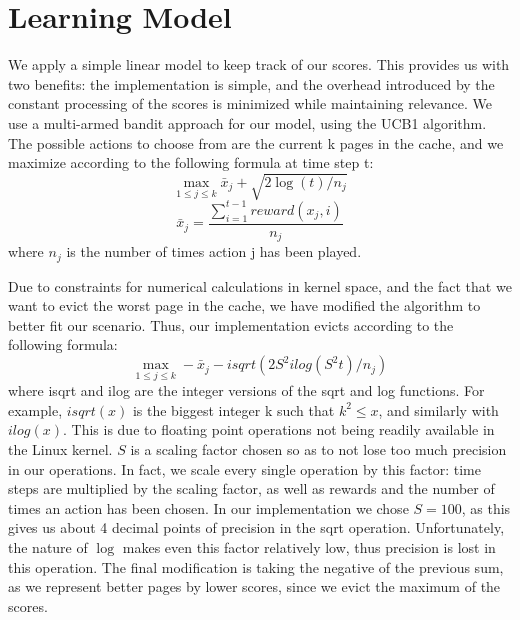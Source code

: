 \section{Learning Model}

We apply a simple linear model to keep track of our scores. This provides us with two benefits: the implementation is simple, and the overhead introduced by the constant processing of the scores is minimized while maintaining relevance. We use a multi-armed bandit approach for our model, using the UCB1 algorithm. The possible actions to choose from are the current k pages in the cache, and we maximize according to the following formula at time step t: $$\max_{1 \leq j \leq k} \bar{x}_{j} + \sqrt{2\log(t)/n_{j}}$$ $$\bar{x}_{j} = \frac{\sum_{i=1}^{t-1} reward(x_{j},i)}{n_{j}}$$ where $n_{j}$ is the number of times action j has been played.

Due to constraints for numerical calculations in kernel space, and the fact that we want to evict the worst page in the cache, we have modified the algorithm to better fit our scenario. Thus, our implementation evicts according to the following formula:  $$\max_{1 \leq j \leq k} -\bar{x}_{j} - isqrt(2S^{2}ilog(S^{2}t)/n_{j})$$ where isqrt and ilog are the integer versions of the sqrt and log functions. For example, $isqrt(x)$ is the biggest integer k such that $k^{2}\leq x$, and similarly with $ilog(x)$. This is due to floating point operations not being readily available in the Linux kernel. $S$ is a scaling factor chosen so as to not lose too much precision in our operations. In fact, we scale every single operation by this factor: time steps are multiplied by the scaling factor, as well as rewards and the number of times an action has been chosen. In our implementation we chose $S=100$, as this gives us about 4 decimal points of precision in the sqrt operation. Unfortunately, the nature of $\log$ makes even this factor relatively low, thus precision is lost in this operation. The final modification is taking the negative of the previous sum, as we represent better pages by lower scores, since we evict the maximum of the scores.